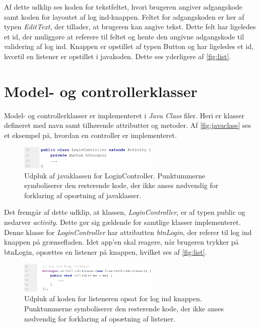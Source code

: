 \noindent
Af dette udklip ses koden for tekstfeltet, hvori brugeren angiver adgangskode samt koden for layoutet af log ind-knappen. Feltet for adgangskoden er her af typen \textit{EditText}, der tillader, at brugeren kan angive tekst. Dette felt har ligeledes et id, der muliggøre at referere til feltet og hente den angivne adgangskode til validering af log ind. Knappen er opstillet af typen Button og har ligeledes et id, hvortil en listener er opstillet i javakoden. Dette ses yderligere af \autoref{fig:list}.

\section{Model- og controllerklasser} \label{sec:impmodelcon}
Model- og controllerklasser er implementeret i \textit{Java Class} filer. Heri er klasser defineret med navn samt tilhørende attributter og metoder. Af \autoref{fig:javaclass} ses et eksempel på, hvordan en controller er implementeret. 

\begin{figure} [H]
\centering
\includegraphics[width=0.6\textwidth]{figures/imple/javaclass}
\caption{Udpluk af javaklassen for LoginController. Punktummerne symboliserer den resterende kode, der ikke anses nødvendig for forklaring af opsætning af javaklasser.}
\label{fig:javaclass}
\end{figure}

\noindent
Det fremgår af dette udklip, at klassen, \textit{LoginController}, er af typen public og nedarver \textit{activity}. Dette gør sig gældende for samtlige klasser implementeret. Denne klasse for \textit{LoginController} har attributten \textit{btnLogin}, der referer til log ind knappen på grænsefladen. Idet app'en skal reagere, når brugeren trykker på btnLogin, opsættes en listener på knappen, hvilket ses af \autoref{fig:list}.


\begin{figure} [H]
\centering
\includegraphics[width=0.6\textwidth]{figures/imple/list}
\caption{Udpluk af koden for listeneren opsat for log ind knappen. Punktummerne symboliserer den resterende kode, der ikke anses nødvendig for forklaring af opsætning af listener.}
\label{fig:list}
\end{figure}


